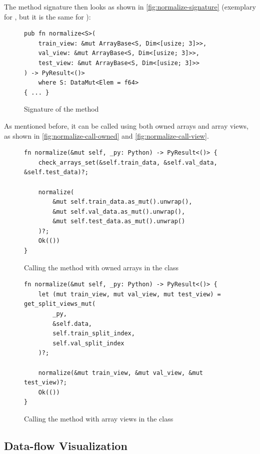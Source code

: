 \documentclass[review]{AIM_report}
\begin{document}
The method signature then looks as shown in \autoref{fig:normalize-signature} (exemplary for \normalize, but it is the same for \standardize):
\begin{figure}[H]
    \begin{lstlisting}[style=rust]
pub fn normalize<S>(
    train_view: &mut ArrayBase<S, Dim<[usize; 3]>>,
    val_view: &mut ArrayBase<S, Dim<[usize; 3]>>,
    test_view: &mut ArrayBase<S, Dim<[usize; 3]>>
) -> PyResult<()>
    where S: DataMut<Elem = f64>
{ ... }
    \end{lstlisting}
    \caption{Signature of the \normalize method}
    \label{fig:normalize-signature}
\end{figure}

As mentioned before, it can be called using both owned arrays and array views, as shown in \autoref{fig:normalize-call-owned} and \autoref{fig:normalize-call-view}.

\begin{figure}[H]
    \begin{lstlisting}[style=rust]
fn normalize(&mut self, _py: Python) -> PyResult<()> {
    check_arrays_set(&self.train_data, &self.val_data, &self.test_data)?;

    normalize(
        &mut self.train_data.as_mut().unwrap(),
        &mut self.val_data.as_mut().unwrap(),
        &mut self.test_data.as_mut().unwrap()
    )?;
    Ok(())
} 
    \end{lstlisting}
    \caption{Calling the \normalize method with owned arrays in the \classificationDataSet class}
    \label{fig:normalize-call-owned}
\end{figure}

\begin{figure}[H]
    \begin{lstlisting}[style=rust]
fn normalize(&mut self, _py: Python) -> PyResult<()> {
    let (mut train_view, mut val_view, mut test_view) = get_split_views_mut(
        _py,
        &self.data,
        self.train_split_index,
        self.val_split_index
    )?;

    normalize(&mut train_view, &mut val_view, &mut test_view)?;
    Ok(())
}
    \end{lstlisting}
    \caption{Calling the \normalize method with array views in the \forecastingDataSet class}
    \label{fig:normalize-call-view}
\end{figure}

\subsection{Data-flow Visualization}
\label{sec:data-flow-diagram}
\end{document}
